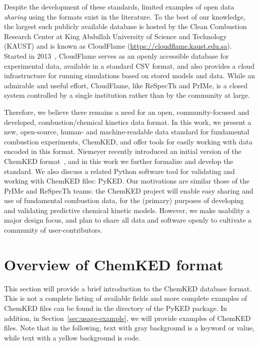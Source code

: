 \documentclass[12pt]{ussci}
\newcommand\ck{ChemKED}
\newcommand\pk{PyKED}
\begin{document}
Despite the development of these standards, limited examples of open data
\emph{sharing} using the formats exist in the literature. To the best
of our knowledge, the largest such publicly available database is hosted by
the Clean Combustion Research Center at King Abdullah University of Science and
Technology (KAUST) and is known as CloudFlame
(\url{https://cloudflame.kaust.edu.sa}). Started in
2013~\autocite{Goteng:2013cf,Goteng:2014,ReynoChiasson:2015}, CloudFlame serves
as an openly accessible database for experimental data, available in a standard
CSV format, and also provides a cloud infrastructure for running simulations
based on stored models and data. While an admirable and useful effort,
CloudFlame, like ReSpecTh and PrIMe, is a closed system controlled by a single
institution rather than by the community at large.

Therefore, we believe there remains a need for an open, community-focused and
developed, combustion\slash chemical kinetics data format. In this work, we
present a new, open-source, human- and machine-readable data standard for
fundamental combustion experiments, \ck{}, and offer tools for easily working
with data encoded in this format. Niemeyer recently introduced an initial
version of the \ck{} format~\autocite{Niemeyer:2016wf}, and in this work we
further formalize and develop the standard. We also discuss a related Python
software tool for validating and working with \ck{} files: \pk{}. Our
motivations are similar those of the PrIMe and ReSpecTh teams: the \ck{} project
will enable easy sharing and use of fundamental combustion data, for the
(primary) purposes of developing and validating predictive chemical kinetic
models. However, we make usability a major design focus, and plan to share all
data and software openly to cultivate a community of user-contributors.

\section{Overview of ChemKED format}\label{sec:overview-of-format}

This section will provide a brief introduction to the \ck{} database format.
This is not a complete listing of available fields and more complete examples of
\ck{} files can be found in the  directory of the \pk{} package. In
addition, in Section~\ref{sec:usage-example}, we will provide examples of \ck{}
files. Note that in the following, text with gray background is a 
keyword or value, while text with a yellow background is  code.
\end{document}
